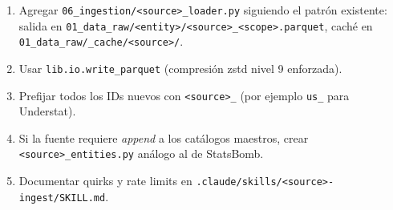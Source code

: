 \begin{enumerate}[label=\textbf{E\arabic*.}]
  \item Agregar \texttt{06\_ingestion/<source>\_loader.py} siguiendo el patrón existente: salida en \texttt{01\_data\_raw/<entity>/<source>\_<scope>.parquet}, caché en \texttt{01\_data\_raw/\_cache/<source>/}.
  \item Usar \texttt{lib.io.write\_parquet} (compresión zstd nivel 9 enforzada).
  \item Prefijar todos los IDs nuevos con \texttt{<source>\_} (por ejemplo \texttt{us\_} para Understat).
  \item Si la fuente requiere \emph{append} a los catálogos maestros, crear \texttt{<source>\_entities.py} análogo al de StatsBomb.
  \item Documentar quirks y rate limits en \texttt{.claude/skills/<source>-ingest/SKILL.md}.
\end{enumerate}
